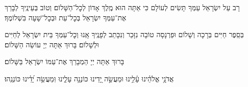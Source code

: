 \weekdaysashofar

\weekdaysamishpat

\weekdaysaminim

\weekdaysatzadikim

\weekdaysayerushelayim

\weekdaysamalchus

\weekdaysashemakoleinu

\retzeh

\yaalehveyavo

\zion

\maarivmodim

\alhanisim

\weekdaysahodos

רָב עַל יִשְׂרָאֵל עַמְּךָ תָּשִׂים לְעוֹלָם כִּי אַתָּה הוּא מֶֽלֶךְ אָדוֹן לְכׇל־הַשָּׁלוֹם׃ וְטוֹב בְּעֵינֶֽיךָ לְבָרֵךְ אֶת־עַמְּךָ יִשְׂרָאֵל בְּכׇל־עֵת וּבְכׇל־שָׁעָה בִּשְׁלוֹמֶךָ׃
\vspace{-0.4\baselineskip}
\begin{paracol}{2}

\begin{small}
בְּסֵֽפֶר חַיִּים בְּרָכָה וְשָׁלוֹם וּפַרְנָסָה טוֹבָה נִזָּכֵר וְנִכָּתֵב לְפָנֶֽיךָ אָֽנוּ וְכׇל־עַמְּךָ בֵּית יִשְׂרָאֵל לְחַיִּים וּלְשָׁלוֹם׃ בָּרוּךְ אַתָּה יְיָ עוֹשֵׂה הַשָּׁלוֹם׃

\end{small}
\switchcolumn
בָּרוּךְ אַתָּה יְיָ הַמְבָרֵךְ אֶת־עַמּוֹ יִשְׂרָאֵל בַּשָּׁלוֹם׃

\end{paracol}



\tachanunim

\vspace{\baselineskip}

\begin{sometimes}


\halfkaddish


\label{vihi noam}

אֲדֹנָ֥י אֱלֹהֵ֗ינוּ עָ֫לֵ֥ינוּ וּמַעֲשֵׂ֣ה יָ֭דֵינוּ כּוֹנְנָ֥ה עָלֵ֑ינוּ וּֽמַעֲשֵׂ֥ה יָ֝דֵ֗ינוּ כּוֹנְנֵֽהוּ׃\\

\label{v ata kadosh}
\kedushadesidra

\end{sometimes}

\fullkaddish


